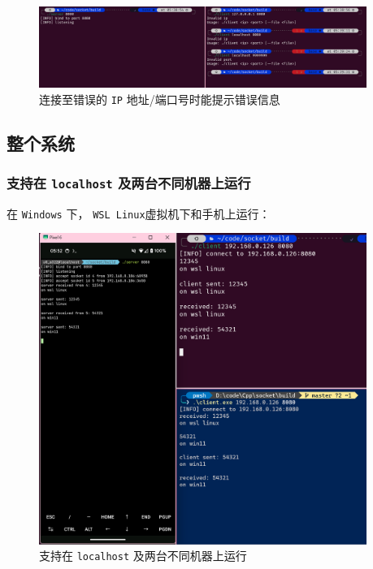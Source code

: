 \documentclass{article}
\begin{document}
\begin{figure}[H]
    \centering
    \includegraphics[width=0.95\textwidth]{img/6.png}
    \caption{连接至错误的 \texttt{IP} 地址/端口号时能提示错误信息}
\end{figure}

\subsection{整个系统}

\subsubsection{支持在 \texttt{localhost} 及两台不同机器上运行}

在 \texttt{Windows} 下， \texttt{WSL Linux}虚拟机下和手机上运行：

\begin{figure}[H]
    \centering
    \includegraphics[width=0.95\textwidth]{img/7.png}
    \caption{支持在 \texttt{localhost} 及两台不同机器上运行}
\end{figure}
\end{document}
